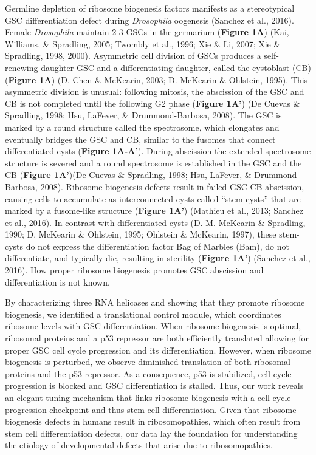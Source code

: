 \documentclass[12pt,oneside]{reedthesis}
\begin{document}
Germline depletion of ribosome biogenesis factors manifests as a stereotypical GSC differentiation defect during \emph{Drosophila} oogenesis (Sanchez et al., 2016). Female \emph{Drosophila} maintain 2-3 GSCs in the germarium (\textbf{Figure 1A}) (Kai, Williams, \& Spradling, 2005; Twombly et al., 1996; Xie \& Li, 2007; Xie \& Spradling, 1998, 2000). Asymmetric cell division of GSCs produces a self-renewing daughter GSC and a differentiating daughter, called the cystoblast (CB) (\textbf{Figure 1A}) (D. Chen \& McKearin, 2003; D. McKearin \& Ohlstein, 1995). This asymmetric division is unusual: following mitosis, the abscission of the GSC and CB is not completed until the following G2 phase (\textbf{Figure 1A'}) (De Cuevas \& Spradling, 1998; Hsu, LaFever, \& Drummond-Barbosa, 2008). The GSC is marked by a round structure called the spectrosome, which elongates and eventually bridges the GSC and CB, similar to the fusomes that connect differentiated cysts (\textbf{Figure 1A-A'}). During abscission the extended spectrosome structure is severed and a round spectrosome is established in the GSC and the CB (\textbf{Figure 1A'})(De Cuevas \& Spradling, 1998; Hsu, LaFever, \& Drummond-Barbosa, 2008). Ribosome biogenesis defects result in failed GSC-CB abscission, causing cells to accumulate as interconnected cysts called ``stem-cysts'' that are marked by a fusome-like structure (\textbf{Figure 1A'}) (Mathieu et al., 2013; Sanchez et al., 2016). In contrast with differentiated cysts (D. M. McKearin \& Spradling, 1990; D. McKearin \& Ohlstein, 1995; Ohlstein \& McKearin, 1997), these stem-cysts do not express the differentiation factor Bag of Marbles (Bam), do not differentiate, and typically die, resulting in sterility (\textbf{Figure 1A'}) (Sanchez et al., 2016). How proper ribosome biogenesis promotes GSC abscission and differentiation is not known.

By characterizing three RNA helicases and showing that they promote ribosome biogenesis, we identified a translational control module, which coordinates ribosome levels with GSC differentiation. When ribosome biogenesis is optimal, ribosomal proteins and a p53 repressor are both efficiently translated allowing for proper GSC cell cycle progression and its differentiation. However, when ribosome biogenesis is perturbed, we observe diminished translation of both ribosomal proteins and the p53 repressor. As a consequence, p53 is stabilized, cell cycle progression is blocked and GSC differentiation is stalled. Thus, our work reveals an elegant tuning mechanism that links ribosome biogenesis with a cell cycle progression checkpoint and thus stem cell differentiation. Given that ribosome biogenesis defects in humans result in ribosomopathies, which often result from stem cell differentiation defects, our data lay the foundation for understanding the etiology of developmental defects that arise due to ribosomopathies.
\end{document}
